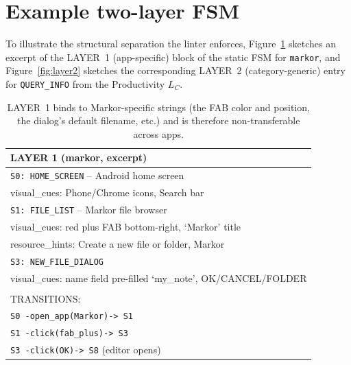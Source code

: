 \section{Example two-layer FSM}
\label{app:fsm-example}

To illustrate the structural separation the linter enforces, Figure~\ref{fig:layer1} sketches an excerpt of the LAYER~1 (app-specific) block of the static FSM for \texttt{markor}, and Figure~\ref{fig:layer2} sketches the corresponding LAYER~2 (category-generic) entry for \texttt{QUERY\_INFO} from the Productivity $L_C$.

\begin{table}[t]
\small
\begin{tabular}{p{}}
\hline
\textbf{LAYER 1 (markor, excerpt)} \\
\hline
\texttt{S0: HOME\_SCREEN} -- Android home screen \\
\hspace{1em} visual\_cues: Phone/Chrome icons, Search bar \\
\texttt{S1: FILE\_LIST} -- Markor file browser \\
\hspace{1em} visual\_cues: red plus FAB bottom-right, `Markor' title \\
\hspace{1em} resource\_hints: Create a new file or folder, Markor \\
\texttt{S3: NEW\_FILE\_DIALOG} \\
\hspace{1em} visual\_cues: name field pre-filled `my\_note', OK/CANCEL/FOLDER \\
\\
TRANSITIONS: \\
\texttt{S0 -open\_app(Markor)-> S1} \\
\texttt{S1 -click(fab\_plus)-> S3} \\
\texttt{S3 -click(OK)-> S8} (editor opens) \\
\hline
\end{tabular}
\caption{LAYER~1 binds to Markor-specific strings (the FAB color and position, the dialog's default filename, etc.) and is therefore non-transferable across apps.}
\label{fig:layer1}
\end{table}

